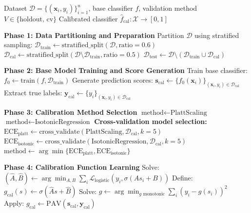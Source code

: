 \documentclass[12pt, a4paper]{article}
\begin{document}
\begin{algorithm}[!h]
\caption{Enhanced Post-hoc Calibration Framework}
\label{alg:enhanced_calibration}
\begin{algorithmic}[1]
\REQUIRE Dataset $\mathcal{D} = \{(\mathbf{x}_i, y_i)\}_{i=1}^n$, base classifier $f$, validation method $V \in \{\text{holdout, cv}\}$
\ENSURE Calibrated classifier $\hat{f}_{\text{cal}}: \mathcal{X} \rightarrow [0,1]$

\STATE \textbf{Phase 1: Data Partitioning and Preparation}
\STATE Partition $\mathcal{D}$ using stratified sampling:
\STATE \hspace{0.5cm} $\mathcal{D}_{\text{train}} \leftarrow \text{stratified\_split}(\mathcal{D}, \text{ratio} = 0.6)$
\STATE \hspace{0.5cm} $\mathcal{D}_{\text{cal}} \leftarrow \text{stratified\_split}(\mathcal{D} \setminus \mathcal{D}_{\text{train}}, \text{ratio} = 0.5)$  
\STATE \hspace{0.5cm} $\mathcal{D}_{\text{test}} \leftarrow \mathcal{D} \setminus (\mathcal{D}_{\text{train}} \cup \mathcal{D}_{\text{cal}})$

\STATE \textbf{Phase 2: Base Model Training and Score Generation}
\STATE Train base classifier: $f_0 \leftarrow \text{train}(f, \mathcal{D}_{\text{train}})$
\STATE Generate prediction scores: $\mathbf{s}_{\text{cal}} \leftarrow \{f_0(\mathbf{x}_i)\}_{(\mathbf{x}_i, y_i) \in \mathcal{D}_{\text{cal}}}$
\STATE Extract true labels: $\mathbf{y}_{\text{cal}} \leftarrow \{y_i\}_{(\mathbf{x}_i, y_i) \in \mathcal{D}_{\text{cal}}}$

\STATE \textbf{Phase 3: Calibration Method Selection}
    \STATE $\text{method} \leftarrow \text{PlattScaling}$ 
    \STATE $\text{method} \leftarrow \text{IsotonicRegression}$ 
\ELSE
    \STATE \textbf{Cross-validation model selection:}
    \STATE $\text{ECE}_{\text{platt}} \leftarrow \text{cross\_validate}(\text{PlattScaling}, \mathcal{D}_{\text{cal}}, k=5)$
    \STATE $\text{ECE}_{\text{isotonic}} \leftarrow \text{cross\_validate}(\text{IsotonicRegression}, \mathcal{D}_{\text{cal}}, k=5)$
    \STATE $\text{method} \leftarrow \arg\min\{\text{ECE}_{\text{platt}}, \text{ECE}_{\text{isotonic}}\}$
\ENDIF

\STATE \textbf{Phase 4: Calibration Function Learning}
    \STATE Solve: $(\hat{A}, \hat{B}) \leftarrow \arg\min_{A,B} \sum_{i} \mathcal{L}_{\text{logistic}}(y_i, \sigma(A s_i + B))$
    \STATE Define: $g_{\text{cal}}(s) \leftarrow \sigma(\hat{A} s + \hat{B})$
\ELSE
    \STATE Solve: $\hat{g} \leftarrow \arg\min_{g \text{ monotonic}} \sum_{i} (y_i - g(s_i))^2$
    \STATE Apply: $g_{\text{cal}} \leftarrow \text{PAV}(\mathbf{s}_{\text{cal}}, \mathbf{y}_{\text{cal}})$ 
\ENDIF


\end{algorithmic}
\end{algorithm}
\end{document}

